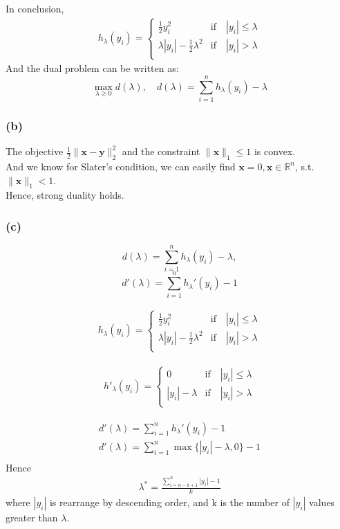 \documentclass[12pt]{article}
\newcommand{\R}{\mathbb{R}}
\begin{document}
In conclusion,
\begin{align*}
    h_{\lambda}(y_i) = \begin{cases}
        \frac{1}{2} y_i^2 &\text{if} \quad |y_i| \leq \lambda \\
        \lambda|y_i| - \frac{1}{2} \lambda^2 &\text{if} \quad |y_i| > \lambda \\
    \end{cases}
\end{align*}
And the dual problem can be written as:
\[\max_{\lambda\geq 0} d(\lambda), \quad d(\lambda) = \sum_{i=1}^n h_\lambda(y_i) - \lambda\]


\subsubsection{(b)}
The objective \(\frac{1}{2} \|\bm{x} - \bm{y}\|_2^2\) and the constraint \(\|\bm{x}\|_1 \leq 1\) is convex. \\
And we know for Slater's condition, we can easily find \(\bm{x} = 0, \bm{x} \in \R^n\), s.t. \(\|\bm{x}\|_1 < 1\). \\
Hence, strong duality holds.

\subsubsection{(c)}
\[d(\lambda) = \sum_{i=1}^n h_\lambda(y_i) - \lambda,\]
\[d'(\lambda) = \sum_{i=1}^{n} h_\lambda'(y_i) - 1\]

\begin{align*}
    h_{\lambda}(y_i) = \begin{cases}
        \frac{1}{2} y_i^2 &\text{if} \quad |y_i| \leq \lambda \\
        \lambda|y_i| - \frac{1}{2} \lambda^2 &\text{if} \quad |y_i| > \lambda \\
    \end{cases}
\end{align*}

\begin{align*}
    h'_{\lambda}(y_i) = \begin{cases}
        0 &\text{if} \quad |y_i| \leq \lambda \\
        |y_i| - \lambda  &\text{if} \quad |y_i| > \lambda \\
    \end{cases}
\end{align*}

\begin{align*}
    d'(\lambda) = \sum_{i=1}^{n} h_\lambda'(y_i) - 1 \\
    d'(\lambda) = \sum_{i=1}^{n} \max\{|y_i| - \lambda, 0\} - 1 \\
\end{align*}
Hence
\begin{align*}
    \lambda^* = \frac{\sum_{i=n-k+1}^{n}|y_{i}| - 1}{k}
\end{align*}
where \(|y_i|\) is rearrange by descending order, and k is the number of \(|y_i|\) values greater than \(\lambda\).
\end{document}
